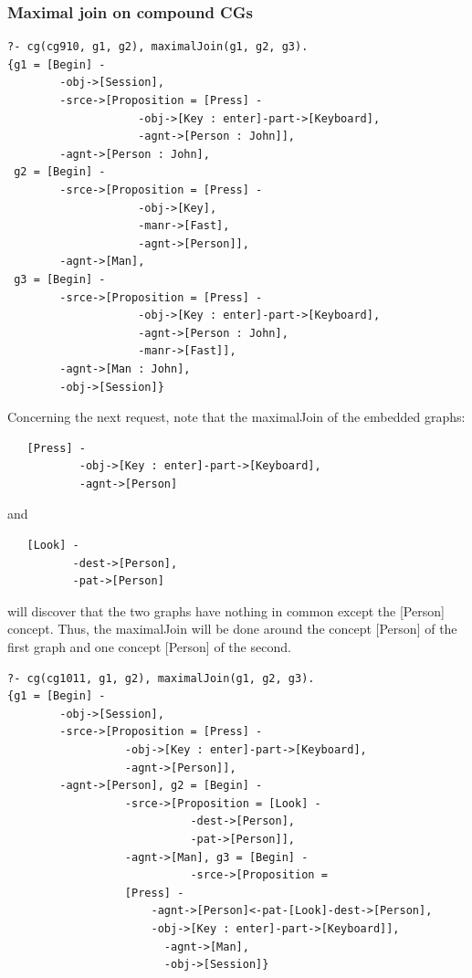 \documentclass{book}
\begin{document}
\subsubsection{Maximal join on compound CGs}


\begin{verbatim}
?- cg(cg910, g1, g2), maximalJoin(g1, g2, g3).
{g1 = [Begin] -
        -obj->[Session],
        -srce->[Proposition = [Press] -
                    -obj->[Key : enter]-part->[Keyboard],
                    -agnt->[Person : John]],
        -agnt->[Person : John], 
 g2 = [Begin] -
        -srce->[Proposition = [Press] -
                    -obj->[Key],
                    -manr->[Fast],
                    -agnt->[Person]],
        -agnt->[Man], 
 g3 = [Begin] -
        -srce->[Proposition = [Press] -
                    -obj->[Key : enter]-part->[Keyboard],
                    -agnt->[Person : John],
                    -manr->[Fast]],
        -agnt->[Man : John],
        -obj->[Session]}
\end{verbatim}


Concerning the next request, note that the maximalJoin of the
embedded graphs:


\begin{verbatim}
   [Press] -
           -obj->[Key : enter]-part->[Keyboard],
           -agnt->[Person]
\end{verbatim}


and

\begin{verbatim}
   [Look] -
          -dest->[Person],
          -pat->[Person]
\end{verbatim}


will discover that the two graphs have
nothing in common except the [Person] concept. Thus, the
maximalJoin will be done around the concept [Person] of the first
graph and one concept [Person] of the second.


\begin{verbatim}
?- cg(cg1011, g1, g2), maximalJoin(g1, g2, g3).
{g1 = [Begin] -
        -obj->[Session],
        -srce->[Proposition = [Press] -
                  -obj->[Key : enter]-part->[Keyboard],
                  -agnt->[Person]],
        -agnt->[Person], g2 = [Begin] -
                  -srce->[Proposition = [Look] -
                            -dest->[Person],
                            -pat->[Person]],
                  -agnt->[Man], g3 = [Begin] -
                            -srce->[Proposition = 
                  [Press] -
                      -agnt->[Person]<-pat-[Look]-dest->[Person],
                      -obj->[Key : enter]-part->[Keyboard]],
                        -agnt->[Man],
                        -obj->[Session]}
\end{verbatim}
\end{document}
